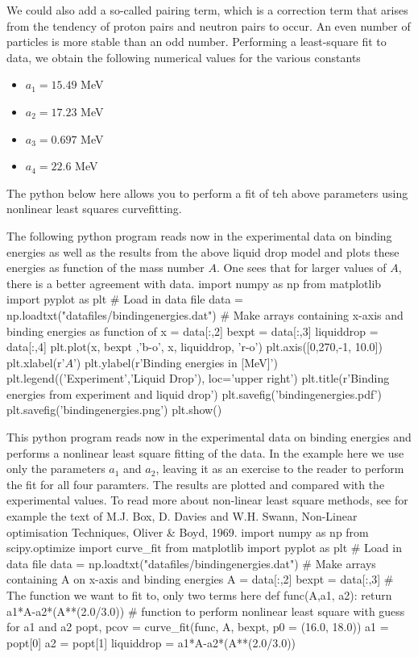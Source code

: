 \documentclass[%
twoside,                 %
final,                   %
10pt]{article}
\begin{document}
\noindent
We could also add a so-called pairing term, which is a correction term that
arises from the tendency of proton pairs and neutron pairs to
occur. An even number of particles is more stable than an odd number. 
Performing a least-square fit to data, we obtain the following numerical values for the various constants
\begin{itemize}
\item $a_1=15.49$ MeV

\item $a_2=17.23$ MeV

\item $a_3=0.697$ MeV

\item $a_4=22.6$ MeV
\end{itemize}

\noindent
The python below here allows you to perform a fit of teh above parameters using nonlinear least squares curvefitting.


The following python program reads now in the experimental data on binding energies as well as the results from the above liquid drop model and plots these energies as function of the mass number $A$. One sees that for larger values of $A$, there is a better agreement with data. 
\bpypro
import numpy as np
from  matplotlib import pyplot as plt
# Load in data file
data = np.loadtxt("datafiles/bindingenergies.dat")
# Make arrays containing x-axis and binding energies as function of
x = data[:,2]
bexpt = data[:,3]
liquiddrop = data[:,4]
plt.plot(x, bexpt ,'b-o', x, liquiddrop, 'r-o')
plt.axis([0,270,-1, 10.0])
plt.xlabel(r'$A$')
plt.ylabel(r'Binding energies in [MeV]')
plt.legend(('Experiment','Liquid Drop'), loc='upper right')
plt.title(r'Binding energies from experiment and liquid drop')
plt.savefig('bindingenergies.pdf')
plt.savefig('bindingenergies.png')
plt.show()
\epypro


This  python program reads now in the experimental data on binding energies and performs a nonlinear least square fitting of the data. In the example here we use only the parameters $a_1$ and $a_2$, leaving it as an exercise to the reader to perform the fit for all four paramters. The results are plotted and compared with the experimental values.  To read more about non-linear least square methods, see for example the text of M.J. Box, D. Davies and W.H. Swann, Non-Linear optimisation Techniques, Oliver {\&} Boyd, 1969.
\bpypro
import numpy as np
from scipy.optimize import curve_fit
from  matplotlib import pyplot as plt
# Load in data file
data = np.loadtxt("datafiles/bindingenergies.dat")
# Make arrays containing A on x-axis and binding energies
A = data[:,2]
bexpt = data[:,3]
# The function we want to fit to, only two terms here
def func(A,a1, a2):
    return a1*A-a2*(A**(2.0/3.0))
# function to perform nonlinear least square with guess for a1 and a2
popt, pcov = curve_fit(func, A, bexpt, p0 = (16.0, 18.0))
a1  = popt[0]
a2 = popt[1]
liquiddrop = a1*A-a2*(A**(2.0/3.0))
\end{document}
